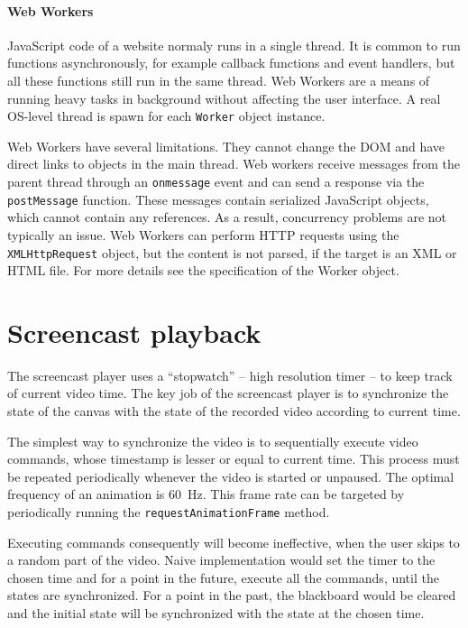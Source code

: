 \paragraph{Web Workers}
JavaScript code of a website normaly runs in a single thread. It is common to run functions asynchronously, for example callback functions and event handlers, but all these functions still run in the same thread. Web Workers are a means of running heavy tasks in background without affecting the user interface. A real OS-level  thread is spawn for each \verb|Worker| object instance.

Web Workers have several limitations. They cannot change the DOM and have direct links to objects in the main thread. Web workers receive messages from the parent thread through an \verb|onmessage| event and can send a response via the \verb|postMessage| function. These messages contain serialized JavaScript objects, which cannot contain any references. As a result, concurrency problems are not typically an issue. Web Workers can perform HTTP requests using the \verb|XMLHttpRequest| object, but the content is not parsed, if the target is an XML or HTML file. For more details see the specification of the Worker object.



\section{Screencast playback}
The screencast player uses a ``stopwatch'' -- high resolution timer -- to keep track of current video time. The key job of the screencast player is to synchronize the state of the canvas with the state of the recorded video according to current time.

The simplest way to synchronize the video is to sequentially execute video commands, whose timestamp is lesser or equal to current time. This process must be repeated periodically whenever the video is started or unpaused. The optimal frequency of an animation is 60~Hz. This frame rate can be targeted by periodically running the \verb|requestAnimationFrame| method.

Executing commands consequently will become ineffective, when the user skips to a random part of the video. Naive implementation would set the timer to the chosen time and for a point in the future, execute all the commands, until the states are synchronized. For a point in the past, the blackboard would be cleared and the initial state will be synchronized with the state at the chosen time.

